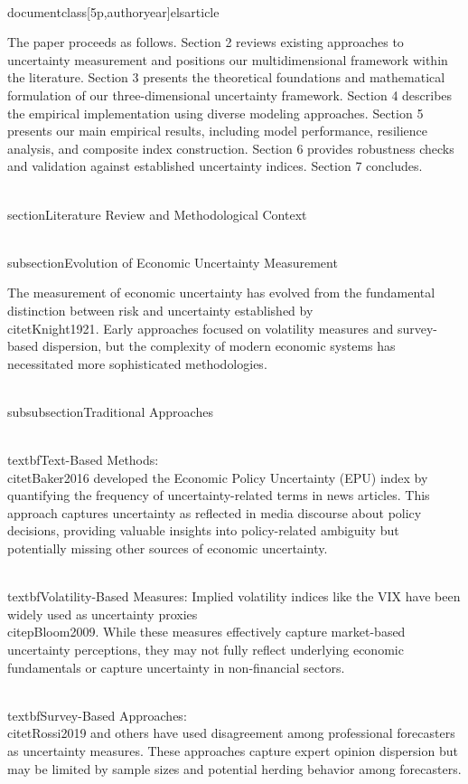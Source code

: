 \\documentclass[5p,authoryear]{elsarticle}
\begin{document}
The paper proceeds as follows. Section 2 reviews existing approaches to uncertainty measurement and positions our multidimensional framework within the literature. Section 3 presents the theoretical foundations and mathematical formulation of our three-dimensional uncertainty framework. Section 4 describes the empirical implementation using diverse modeling approaches. Section 5 presents our main empirical results, including model performance, resilience analysis, and composite index construction. Section 6 provides robustness checks and validation against established uncertainty indices. Section 7 concludes.

\\section{Literature Review and Methodological Context}

\\subsection{Evolution of Economic Uncertainty Measurement}

The measurement of economic uncertainty has evolved from the fundamental distinction between risk and uncertainty established by \\citet{Knight1921}. Early approaches focused on volatility measures and survey-based dispersion, but the complexity of modern economic systems has necessitated more sophisticated methodologies.

\\subsubsection{Traditional Approaches}

\\textbf{Text-Based Methods:} \\citet{Baker2016} developed the Economic Policy Uncertainty (EPU) index by quantifying the frequency of uncertainty-related terms in news articles. This approach captures uncertainty as reflected in media discourse about policy decisions, providing valuable insights into policy-related ambiguity but potentially missing other sources of economic uncertainty.

\\textbf{Volatility-Based Measures:} Implied volatility indices like the VIX have been widely used as uncertainty proxies \\citep{Bloom2009}. While these measures effectively capture market-based uncertainty perceptions, they may not fully reflect underlying economic fundamentals or capture uncertainty in non-financial sectors.

\\textbf{Survey-Based Approaches:} \\citet{Rossi2019} and others have used disagreement among professional forecasters as uncertainty measures. These approaches capture expert opinion dispersion but may be limited by sample sizes and potential herding behavior among forecasters.
\end{document}
